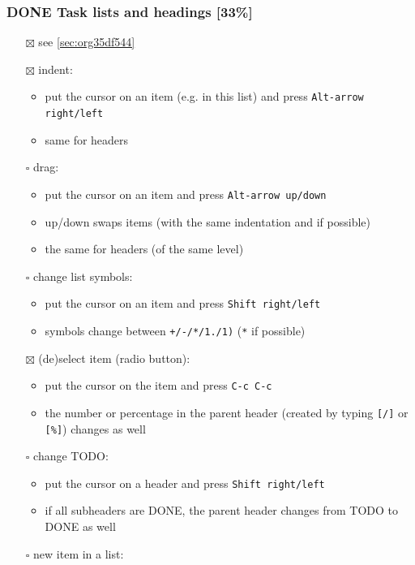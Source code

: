 \documentclass[11pt]{article}
\begin{document}
\subsubsection{{\bfseries\sffamily DONE} Task lists and headings [33\%]}
\label{sec:orge7c8c57}
\begin{itemize}
\item[{$\boxtimes$}] see \ref{sec:org35df544}
\item[{$\boxtimes$}] indent:
\begin{itemize}
\item put the cursor on an item (e.g. in this list) and press \texttt{Alt-arrow right/left}
\item same for headers
\end{itemize}
\item[{$\square$}] drag:
\begin{itemize}
\item put the cursor on an item and press \texttt{Alt-arrow up/down}
\item up/down swaps items (with the same indentation and if possible)
\item the same for headers (of the same level)
\end{itemize}
\item[{$\square$}] change list symbols:
\begin{itemize}
\item put the cursor on an item and press \texttt{Shift right/left}
\item symbols change between \texttt{+/-/*/1./1)} (\texttt{*} if possible)
\end{itemize}
\item[{$\boxtimes$}] (de)select item (radio button):
\begin{itemize}
\item put the cursor on the item and press \texttt{C-c C-c}
\item the number or percentage in the parent header (created by typing \texttt{[/]} or \texttt{[\%]}) changes as well
\end{itemize}
\item[{$\square$}] change TODO:
\begin{itemize}
\item put the cursor on a header and press \texttt{Shift right/left}
\item if all subheaders are DONE, the parent header changes from TODO to DONE as well
\end{itemize}
\item[{$\square$}] new item in a list:

\end{itemize}
\end{document}
